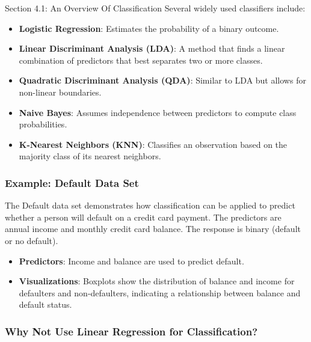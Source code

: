 \begin{notes}{Section 4.1: An Overview Of Classification}
    Several widely used classifiers include:
    \begin{itemize}
        \item \textbf{Logistic Regression}: Estimates the probability of a binary outcome.
        \item \textbf{Linear Discriminant Analysis (LDA)}: A method that finds a linear combination of predictors that best separates two or more classes.
        \item \textbf{Quadratic Discriminant Analysis (QDA)}: Similar to LDA but allows for non-linear boundaries.
        \item \textbf{Naive Bayes}: Assumes independence between predictors to compute class probabilities.
        \item \textbf{K-Nearest Neighbors (KNN)}: Classifies an observation based on the majority class of its nearest neighbors.
    \end{itemize}
    
    \subsubsection*{Example: Default Data Set}
    
    The Default data set demonstrates how classification can be applied to predict whether a person will default on a credit card payment. The predictors are annual income and monthly credit card balance. 
    The response is binary (default or no default).
    
    \begin{highlight}
        \begin{itemize}
            \item \textbf{Predictors}: Income and balance are used to predict default.
            \item \textbf{Visualizations}: Boxplots show the distribution of balance and income for defaulters and non-defaulters, indicating a relationship between balance and default status.
        \end{itemize}
    \end{highlight}
    
    \subsubsection*{Why Not Use Linear Regression for Classification?}
    

\end{notes}
